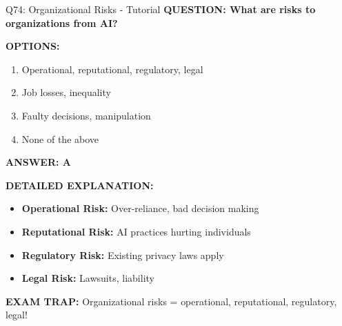 \documentclass[8pt]{beamer}
\begin{document}
	\begin{frame}{Q74: Organizational Risks - Tutorial}
		\fontsize{6.5}{7.5}\selectfont
		\textbf{QUESTION: What are risks to organizations from AI?}
		
		\vspace{0.1cm}
		\textbf{OPTIONS:}
		\begin{enumerate}
			\item Operational, reputational, regulatory, legal
			\item Job losses, inequality
			\item Faulty decisions, manipulation
			\item None of the above
		\end{enumerate}
		
		\vspace{0.1cm}
		\textcolor{myblue}{\textbf{ANSWER: A}}
		
		\vspace{0.1cm}
		\textbf{DETAILED EXPLANATION:}
		\begin{itemize}
			\item \textbf{Operational Risk:} Over-reliance, bad decision making
			\item \textbf{Reputational Risk:} AI practices hurting individuals
			\item \textbf{Regulatory Risk:} Existing privacy laws apply
			\item \textbf{Legal Risk:} Lawsuits, liability
		\end{itemize}
		
		\vspace{0.1cm}
		\textcolor{myred}{\textbf{EXAM TRAP:}} Organizational risks = \textcolor{myblue}{operational, reputational, regulatory, legal}!
	\end{frame}
	
\end{document}
